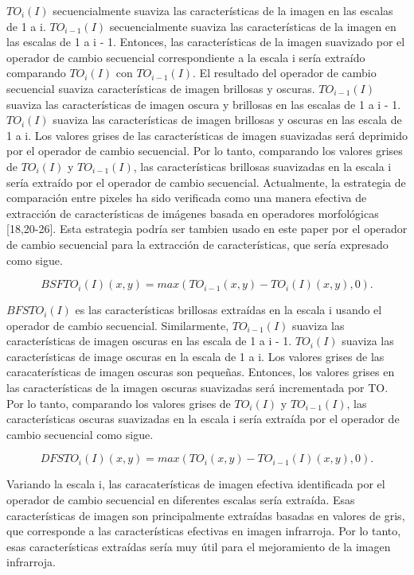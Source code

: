\documentclass[a4paper, 11 pt, conference]{ieeeconf}      %
\begin{document}
$TO_i(I)$ secuencialmente suaviza las caracter\'isticas de la imagen en las escalas de 1 a i. $TO_{i-1}(I)$ secuencialmente suaviza las caracter\'isticas de la imagen en las escalas de 1 a i - 1. Entonces, las caracter\'isticas de la imagen suavizado por el operador de cambio secuencial correspondiente a la escala i ser\'ia extra\'ido comparando $TO_i(I) $ con $TO_{i-1}(I)$.
El resultado del operador de cambio secuencial suaviza caracter\'isticas de imagen brillosas y oscuras. $TO_{i-1}(I)$ suaviza las caracter\'isticas de imagen oscura y brillosas en las escalas de 1 a i - 1. $TO_i(I)$ suaviza las caracter\'isticas de imagen brillosas y oscuras en las escala de 1 a i. Los valores grises de las caracter\'isticas de imagen suavizadas ser\'a deprimido por el operador de cambio secuencial. Por lo tanto, comparando los valores grises de $TO_i(I)$ y $TO_{i-1}(I)$, las caracter\'isticas brillosas suavizadas en la escala i ser\'ia extra\'ido por el operador de cambio secuencial. Actualmente, la estrategia de comparaci\'on entre pixeles ha sido verificada como una manera efectiva de extracci\'on de caracter\'isticas de im\'agenes basada en operadores morfol\'ogicas [18,20-26]. Esta estrategia podr\'ia ser tambien usado en este paper por el operador de cambio secuencial para la extracci\'on de caracter\'isticas, que ser\'ia expresado como sigue.
\begin{small}


$$
BSFTO_i(I)(x,y) = max(TO_{i-1}(x,y) - TO_i(I)(x,y),0).
$$

\end{small}
$BFSTO_i(I)$ es las caracter\'isticas brillosas extra\'idas en la escala i usando el operador de cambio secuencial.
Similarmente, $TO_{i-1}(I) $ suaviza las caracter\'isticas de imagen oscuras en las escala de 1 a i - 1. $TO_i(I)$ suaviza las caracter\'isticas de image oscuras en la escala de 1 a i. Los valores grises de las caracater\'isticas de imagen oscuras son pequeñas. Entonces, los valores grises en las caracter\'isticas de la imagen oscuras suavizadas ser\'a incrementada por TO. Por lo tanto, comparando los valores grises de $TO_i(I)$ y $TO_{i-1}(I)$, las caracter\'isticas oscuras suavizadas en la escala i ser\'ia extra\'ida por el operador de cambio secuencial como sigue.

\begin{small}
$$
DFSTO_i(I)(x,y) = max(TO_i(x,y) - TO_{i-1}(I)(x,y),0).
$$

\end{small}

Variando la escala i, las caracater\'isticas de imagen efectiva identificada por el operador de cambio secuencial en diferentes escalas ser\'ia extra\'ida. Esas caracter\'isticas de imagen son principalmente extra\'idas basadas en valores de gris, que corresponde a las caracter\'isticas efectivas en imagen infrarroja. Por lo tanto, esas caracter\'isticas extra\'idas ser\'ia muy \'util para el mejoramiento de la imagen infrarroja.
\end{document}
